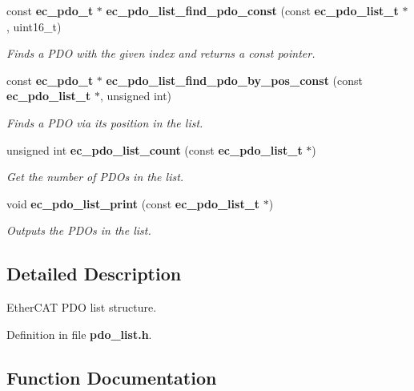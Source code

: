 \begin{DoxyCompactItemize}
const {\bf ec\-\_\-pdo\-\_\-t} $\ast$ {\bf ec\-\_\-pdo\-\_\-list\-\_\-find\-\_\-pdo\-\_\-const} (const {\bf ec\-\_\-pdo\-\_\-list\-\_\-t} $\ast$, uint16\-\_\-t)
\begin{DoxyCompactList}\small\item\em Finds a P\-D\-O with the given index and returns a const pointer. \end{DoxyCompactList}\item 
const {\bf ec\-\_\-pdo\-\_\-t} $\ast$ {\bf ec\-\_\-pdo\-\_\-list\-\_\-find\-\_\-pdo\-\_\-by\-\_\-pos\-\_\-const} (const {\bf ec\-\_\-pdo\-\_\-list\-\_\-t} $\ast$, unsigned int)
\begin{DoxyCompactList}\small\item\em Finds a P\-D\-O via its position in the list. \end{DoxyCompactList}\item 
unsigned int {\bf ec\-\_\-pdo\-\_\-list\-\_\-count} (const {\bf ec\-\_\-pdo\-\_\-list\-\_\-t} $\ast$)
\begin{DoxyCompactList}\small\item\em Get the number of P\-D\-Os in the list. \end{DoxyCompactList}\item 
void {\bf ec\-\_\-pdo\-\_\-list\-\_\-print} (const {\bf ec\-\_\-pdo\-\_\-list\-\_\-t} $\ast$)\label{pdo__list_8h_ac7e42782cb2774a74ffd38e792e7da7c}

\begin{DoxyCompactList}\small\item\em Outputs the P\-D\-Os in the list. \end{DoxyCompactList}\end{DoxyCompactItemize}


\subsection{Detailed Description}
Ether\-C\-A\-T P\-D\-O list structure. 

Definition in file {\bf pdo\-\_\-list.\-h}.



\subsection{Function Documentation}
